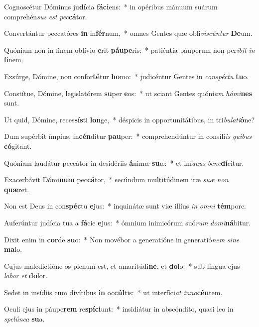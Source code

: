 \item Cognoscétur Dóminus ju\textbf{dí}cia \textbf{fá}\textbf{ci}ens:~* in opéribus mánuum suárum comprehén\textit{sus} \textit{est} \textit{pec}\textbf{cá}tor.
\item Convertántur peccatóres \textbf{in} in\textbf{fér}num,~* omnes Gentes quæ obli\textit{vis}\textit{cún}\textit{tur} \textbf{De}um.
\item Quóniam non in finem oblívio \textbf{e}rit \textbf{páu}\textbf{pe}ris:~* patiéntia páuperum non per\textit{í}\textit{bit} \textit{in} \textbf{fi}nem.
\item Exsúrge, Dómine, non confor\textbf{té}tur \textbf{ho}mo:~* judicéntur Gentes in \textit{con}\textit{spéc}\textit{tu} \textbf{tu}o.
\item Constítue, Dómine, legislatórem \textbf{su}per \textbf{e}os:~* ut sciant Gentes quóni\textit{am} \textit{hó}\textit{mi}\textbf{nes} sunt.
\item Ut quid, Dómine, reces\textbf{sís}ti \textbf{lon}ge,~* déspicis in opportunitátibus, in tri\textit{bu}\textit{la}\textit{ti}\textbf{ó}ne?
\item Dum supérbit ímpius, in\textbf{cén}ditur \textbf{pau}per:~* comprehendúntur in consíli\textit{is} \textit{qui}\textit{bus} \textbf{có}gitant.
\item Quóniam laudátur peccátor in desidériis \textbf{á}nimæ \textbf{su}æ:~* et iní\textit{quus} \textit{be}\textit{ne}\textbf{dí}citur.
\item Exacerbávit Dómi\textbf{num} pec\textbf{cá}tor,~* secúndum multitúdinem iræ \textit{su}\textit{æ} \textit{non} \textbf{quæ}ret.
\item Non est Deus in con\textbf{spéc}tu \textbf{e}jus:~* inquinátæ sunt viæ illíus \textit{in} \textit{om}\textit{ni} \textbf{tém}pore.
\item Auferúntur judícia tua a \textbf{fá}cie \textbf{e}jus:~* ómnium inimicórum suó\textit{rum} \textit{do}\textit{mi}\textbf{ná}bitur.
\item Dixit enim in \textbf{cor}de \textbf{su}o:~* Non movébor a generatióne in generatió\textit{nem} \textit{si}\textit{ne} \textbf{ma}lo.
\item Cujus maledictióne os plenum est, et amaritúdi\textbf{ne}, et \textbf{do}lo:~* sub lingua ejus \textit{la}\textit{bor} \textit{et} \textbf{do}lor.
\item Sedet in insídiis cum divítibus \textbf{in} oc\textbf{cúl}tis:~* ut interfíci\textit{at} \textit{in}\textit{no}\textbf{cén}tem.
\item Oculi ejus in páupe\textbf{rem} re\textbf{spí}\textbf{ci}unt:~* insidiátur in abscóndito, quasi leo in \textit{spe}\textit{lún}\textit{ca} \textbf{su}a.
